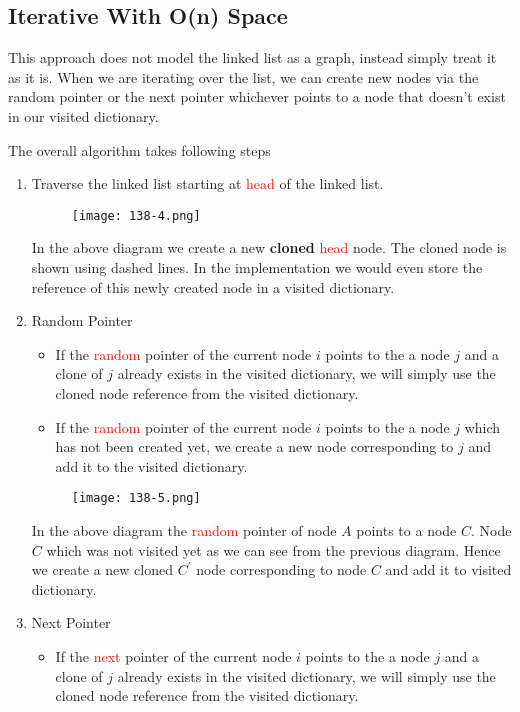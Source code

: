 \subsection{Iterative With O(n) Space}
This approach does not model the linked list as a graph, instead simply treat it as it is. When we are iterating over the list, we can create new nodes via the random pointer or the next pointer whichever points to a node that doesn't exist in our visited dictionary.
\par
The overall algorithm takes following steps
\begin{enumerate}
    \item Traverse the linked list starting at \textcolor{red}{head} of the linked list.
        \begin{figure}[H]
        \centering
        \texttt{[image: 138-4.png]}
        \end{figure}
    In the above diagram we create a new \textbf{cloned} \textcolor{red}{head} node. The cloned node is shown using dashed lines. In the implementation we would even store the reference of this newly created node in a visited dictionary.
    \item Random Pointer
    \begin{itemize}
        \item If the \textcolor{red}{random} pointer of the current node $i$ points to the a node $j$ and a clone of $j$ already exists in the visited dictionary, we will simply use the cloned node reference from the visited dictionary.
        \item If the \textcolor{red}{random} pointer of the current node $i$ points to the a node $j$ which has not been created yet, we create a new node corresponding to $j$ and add it to the visited dictionary.
    \end{itemize}
        \begin{figure}[H]
        \centering
        \texttt{[image: 138-5.png]}
        \end{figure}    
    In the above diagram the \textcolor{red}{random} pointer of node $A$ points to a node $C$. Node $C$ which was not visited yet as we can see from the previous diagram. Hence we create a new cloned $C^{'}$ node corresponding to node $C$ and add it to visited dictionary.
    \item Next Pointer
    \begin{itemize}
        \item If the \textcolor{red}{next} pointer of the current node $i$ points to the a node $j$ and a clone of $j$ already exists in the visited dictionary, we will simply use the cloned node reference from the visited dictionary.

\end{itemize}
\end{enumerate}
